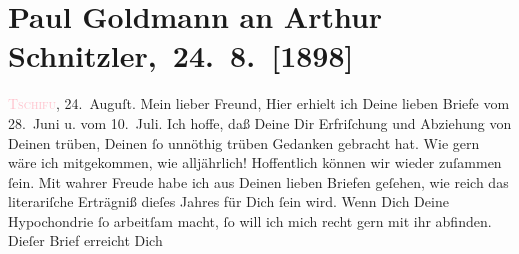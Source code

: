 

               \section[ Paul Goldmann an Arthur Schnitzler, 24. 8. {[}1898{]}]{Paul Goldmann an Arthur Schnitzler, 24. 8. {[}1898{]}}\nopagebreak{}\rehead{ }\normalsize\beginnumbering{} \toendnotes[C]{\smallbreak\pagebreak[2]} 
\toendnotes[C]{\smallbreak}\pstart
           \raggedleft{}{\pb}\textsc{\textcolor{pink}{Tschifu}{}\ledrightnote{\textcolor{pink}{Yantai}}}, 24. Auguſt.\pend
           \pstart\center{}Mein lieber Freund,\pend\pstart
           Hier erhielt ich Deine lieben Briefe vom 28. Juni u.
               vom 10. Juli. Ich hoffe, daß Deine \label{K_L02854-1v}\label{K_L02854-1h} Dir Erfriſchung und Abziehung von Deinen trüben, Deinen ſo unnöthig trüben
               Gedanken gebracht hat. Wie gern wäre ich \strikeout{\textcolor{gray}{mt}} mitgekommen, wie alljährlich! Hoffentlich können wir \label{K_L02854-2v}\label{K_L02854-2h} wieder zuſammen
               ſein.\pend
           \pstart
           Mit wahrer Freude habe ich aus Deinen lieben Briefen geſehen, wie reich das
               literariſche Erträgniß dieſes Jahres für Dich ſein wird.
               Wenn Dich Deine Hypochondrie {\pb}ſo arbeitſam macht, ſo
               will ich mich recht gern mit ihr  abfinden. Dieſer Brief erreicht Dich

